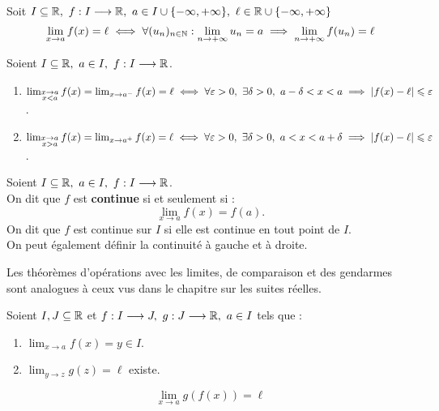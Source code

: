\begin{theorem}
	Soit $I \subseteq \mathbb{R},\ f : I \longrightarrow \mathbb{R},\ a \in I \cup \{-\infty, +\infty\},\ \ell \in \mathbb{R} \cup \{-\infty, +\infty\}$
	\[ \lim_{x \to a} f(x) = \ell \iff \forall (u_n)_{n \in \mathbb{N}} : \lim_{n \to +\infty} u_n = a \implies \lim_{n \to +\infty} f(u_n) = \ell \]
\end{theorem}

\begin{definition}
    Soient $I \subseteq \mathbb{R},\ a \in I,\ f : I \longrightarrow \mathbb{R} $.
    \begin{enumerate}
        \item $ \lim_{\substack{x \to a \\ x < a}} f(x) = \lim_{x \to a^-} f(x) = \ell \iff \forall \varepsilon > 0,\ \exists \delta > 0,\ a - \delta < x < a \implies \abs{f(x) - \ell} \leq \varepsilon $.
        \item $\lim_{\substack{x \to a \\ x > a}} f(x) = \lim_{x \to a^+} f(x) = \ell \iff \forall \varepsilon > 0,\ \exists \delta > 0,\ a < x < a + \delta \implies \abs{f(x) - \ell} \leq \varepsilon$.
    \end{enumerate}
\end{definition}

\begin{definition}[Continuité]
	Soient $I \subseteq \mathbb{R},\ a \in I,\ f : I \longrightarrow \mathbb{R}$.
        \\ 
        On dit que $f$ est \textbf{continue} si et seulement si :
        \[\lim_{x \to a} f(x) = f(a).\] 
	On dit que $f$ est continue sur $I$ si elle est continue en tout point de $I$.\\
	On peut également définir la continuité à gauche et à droite.
\end{definition}

\begin{remark}
	Les théorèmes d'opérations avec les limites, de comparaison et des gendarmes sont analogues à ceux vus  dans le chapitre sur les suites réelles.
\end{remark}

\begin{theorem}
	Soient $I, J \subseteq \mathbb{R}$ et $f : I \longrightarrow J,\ g : J \longrightarrow \mathbb{R},\ a \in I$ tels que :
	\begin{enumerate}
		\item $\lim_{x \to a} f(x) = y \in I$.
		\item $\lim_{y \to z} g(z) = \ell$ existe.
	\end{enumerate}
	\[ \lim_{x \to a} g(f(x)) = \ell \]
\end{theorem}



